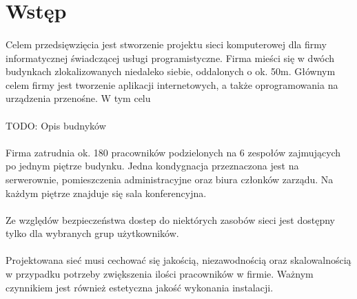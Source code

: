 \section{Wstęp}

\paragraph{}
Celem przedsięwzięcia jest stworzenie projektu sieci komputerowej dla firmy informatycznej świadczącej usługi programistyczne.
Firma mieści się w dwóch budynkach zlokalizowanych niedaleko siebie, oddalonych o ok. 50m.
Głównym celem firmy jest tworzenie aplikacji internetowych, a także oprogramowania na urządzenia przenośne.
W tym celu

\paragraph{}
TODO: Opis budnyków

\paragraph{}
Firma zatrudnia ok. 180 pracowników podzielonych na 6 zespołów zajmujących po jednym piętrze budynku.
Jedna kondygnacja przeznaczona jest na serwerownie, pomieszczenia administracyjne oraz biura członków zarządu.
Na każdym piętrze znajduje się sala konferencyjna.

\paragraph{}
Ze względów bezpieczeństwa dostep do niektórych zasobów sieci jest dostępny tylko dla wybranych grup użytkowników.

\paragraph{}
Projektowana sieć musi cechować się jakością, niezawodnością oraz skalowalnością w przypadku potrzeby zwiększenia ilości pracowników w firmie. Ważnym czynnikiem jest również estetyczna jakość wykonania instalacji.

